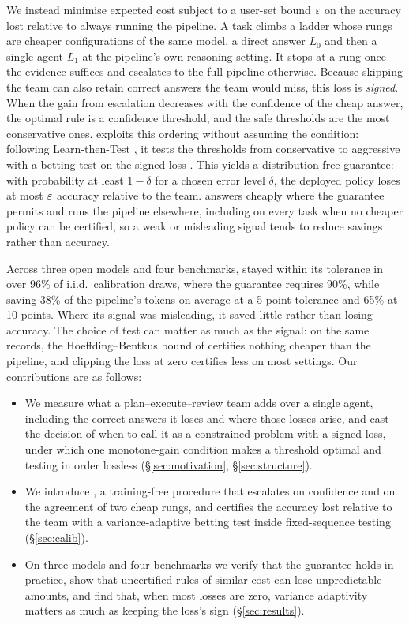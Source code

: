 We instead minimise expected cost subject to a user-set bound $\varepsilon$ on the accuracy lost relative to always running
the pipeline. A task climbs a ladder whose rungs are cheaper configurations of the same model, a direct answer
$L_0$ and then a single agent $L_1$ at the pipeline's own reasoning setting. It stops at a rung once the
evidence suffices and escalates to the full pipeline otherwise. Because skipping the team can also retain
correct answers the team would miss, this loss is \emph{signed}. When the gain from escalation decreases with
the confidence of the cheap answer, the optimal rule is a confidence threshold, and the safe thresholds are the
most conservative ones. \climb{} exploits this ordering without assuming the condition: following
Learn-then-Test \citep{angelopoulos2021ltt}, it tests the thresholds from conservative to aggressive with a
betting test on the signed loss \citep{waudbysmith2024betting}. This yields a distribution-free guarantee: with
probability at least $1-\delta$ for a chosen error level $\delta$, the deployed policy loses at most $\varepsilon$ accuracy relative to the team.
\climb{} answers cheaply where the guarantee permits and runs the pipeline elsewhere, including on every task
when no cheaper policy can be certified, so a weak or misleading signal tends to reduce savings rather than
accuracy.

Across three open models and four benchmarks, \climb{} stayed within its tolerance in over 96\% of i.i.d.\
calibration draws, where the guarantee requires 90\%, while saving 38\% of the pipeline's tokens on average at
a 5-point tolerance and 65\% at 10 points. Where its signal was misleading, it saved little rather than losing
accuracy. The choice of test can matter as much as the signal: on the same records, the Hoeffding--Bentkus
bound of \citet{wynn2026corrupted} certifies nothing cheaper than the pipeline, and clipping the loss at zero
certifies less on most settings. Our contributions are as follows:
\begin{itemize}
    \setlength{\itemsep}{1pt}
    \setlength{\parskip}{0pt}
    \setlength{\parsep}{0pt}
    \item We measure what a plan--execute--review team adds over a single agent, including the correct
    answers it loses and where those losses arise, and cast the decision of when to call it as a
    constrained problem with a signed loss, under which one monotone-gain condition makes a threshold optimal and testing in order lossless (\S\ref{sec:motivation}, \S\ref{sec:structure}).
    \item We introduce \climb{}, a training-free procedure that escalates on confidence and on the
    agreement of two cheap rungs, and certifies the accuracy lost relative to the team with a
    variance-adaptive betting test inside fixed-sequence testing (\S\ref{sec:calib}).
    \item On three models and four benchmarks we verify that the guarantee holds in practice, show that uncertified rules of
    similar cost can lose unpredictable amounts, and find that, when most losses are zero, variance adaptivity matters as much as keeping the loss's sign (\S\ref{sec:results}).
\end{itemize}

